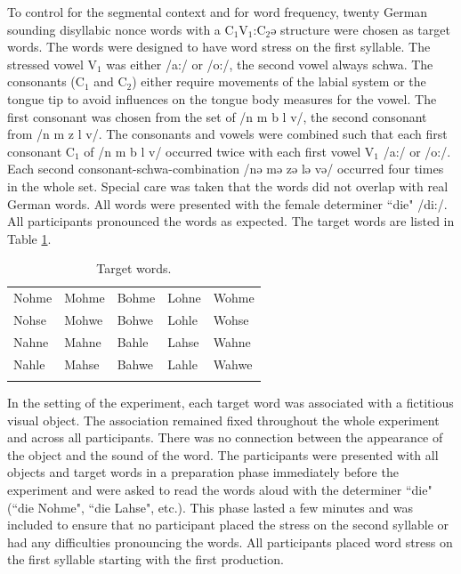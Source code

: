 To control for the segmental context and for word frequency, twenty German sounding disyllabic nonce words with a C$_1$V$_1$:C$_2$ǝ structure were chosen as target words. The words were designed to have word stress on the first syllable. The stressed vowel V$_1$ was either /a:/ or /o:/, the second vowel always schwa. The consonants (C$_1$ and C$_2$) either require movements of the labial system or the tongue tip to avoid influences on the tongue body measures for the vowel. The first consonant was chosen from the set of /n m b l v/, the second consonant from /n m z l v/. The consonants and vowels were combined such that each first consonant C$_1$ of /n m b l v/ occurred twice with each first vowel V$_1$ /a:/ or /o:/. Each second consonant-schwa-combination /nǝ mǝ zǝ lǝ vǝ/ occurred four times in the whole set. Special care was taken that the words did not overlap with real German words. All words were presented with the female determiner ``die" /di:/. All participants pronounced the words as expected. The target words are listed in Table \ref{tab:target_words}.

\begin{table}
\caption{Target words.}
\begin{tabularx}{\textwidth}{XXXXl}
\lsptoprule
Nohme & Mohme & Bohme & Lohne & Wohme \\ 
Nohse & Mohwe & Bohwe & Lohle & Wohse \\ 
Nahne & Mahne & Bahle & Lahse & Wahne \\ 
Nahle & Mahse & Bahwe & Lahle & Wahwe\\
\lspbottomrule
\end{tabularx}
\label{tab:target_words}
\end{table}

In the setting of the experiment, each target word was associated with a fictitious visual object. The association remained fixed throughout the whole experiment and across all participants. There was no connection between the appearance of the object and the sound of the word. The participants were presented with all objects and target words in a preparation phase immediately before the experiment and were asked to read the words aloud with the determiner ``die" (``die Nohme", ``die Lahse", etc.). This phase lasted a few minutes and was included to ensure that no participant placed the stress on the second syllable or had any difficulties pronouncing the words. All participants placed word stress on the first syllable starting with the first production.

